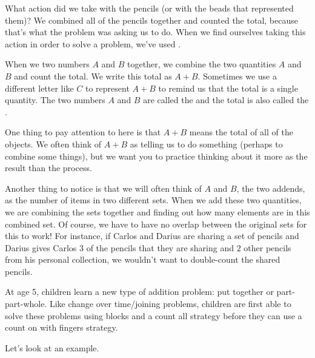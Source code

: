 \documentclass{ximera}
\begin{document}
What action did we take with the pencils (or with the beads that represented them)? We combined all of the pencils together and counted the total, because that's what the problem was asking us to do. When we find ourselves taking this action in order to solve a problem, we've used .

\begin{definition}
When we  two numbers $A$ and $B$ together, we combine the two quantities $A$ and $B$ and count the total. We write this total as $A+B$. Sometimes we use a different letter like $C$ to represent $A+B$ to remind us that the total is a single quantity. The two numbers $A$ and $B$ are called the  and the total is also called the .
\begin{image}
\end{image}
\end{definition}

One thing to pay attention to here is that $A+B$ means the total of all of the objects. We often think of $A+B$ as telling us to do something (perhaps to combine some things), but we want you to practice thinking about it more as the result than the process.

Another thing to notice is that we will often think of $A$ and $B$, the two addends, as the number of items in two different sets. When we add these two quantities, we are combining the sets together and finding out how many elements are in this combined set. Of course, we have to have no overlap between the original sets for this to work! For instance, if Carlos and Darius are sharing a set of pencils and Darius gives Carlos $3$ of the pencils that they are sharing and $2$ other pencils from his personal collection, we wouldn't want to double-count the shared pencils.

At age 5, children learn a new type of addition problem: put together or part-part-whole. Like change over time/joining problems, children are first able to solve these problems using blocks and a count all strategy before they can use a count on with fingers strategy. 

Let's look at an example.
\end{document}
